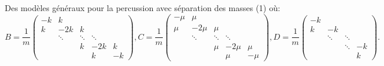 \begin{frame}{Des modèles généraux pour la percussion avec séparation des masses (1)}
	où:
	\scriptsize
	$$
B = \frac{1}{m} \begin{pmatrix}
    -k & k &  &  &  \\
    k & -2k & k &  &  \\
     & \ddots & \ddots & \ddots &  \\
     &  & k & -2k & k \\
     &  &  & k & -k
    \end{pmatrix} , 
C = \frac{1}{m} \begin{pmatrix}
    -\mu & \mu &  &  &  \\
    \mu & -2\mu & \mu &  &  \\
     & \ddots & \ddots & \ddots &  \\
     &  & \mu & -2\mu & \mu \\
     &  &  & \mu & -\mu
    \end{pmatrix} , 
D = \frac{1}{m} \begin{pmatrix}
    -k &  &  &  \\
    k & -k &  &  \\
     & \ddots & \ddots &  \\
     &  & \ddots & -k \\
     &  &  & k 
    \end{pmatrix}.
	$$
    \normalsize
\end{frame}


